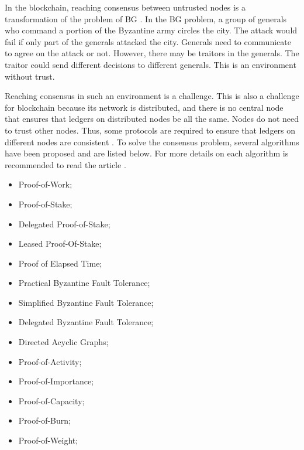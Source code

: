 In the blockchain, reaching consensus between untrusted nodes is a transformation of the problem of \ac{BG} \cite{lamport1982byzantine}. In the BG problem, a group of generals who command a portion of the Byzantine army circles the city. The attack would fail if only part of the generals attacked the city. Generals need to communicate to agree on the attack or not. However, there may be traitors in the generals. The traitor could send different decisions to different generals. This is an environment without trust.

Reaching consensus in such an environment is a challenge. This is also a challenge for blockchain because its network is distributed, and there is no central node that ensures that ledgers on distributed nodes be all the same. Nodes do not need to trust other nodes. Thus, some protocols are required to ensure that ledgers on different nodes are consistent \cite{kostarev2017review}. To solve the consensus problem, several algorithms have been proposed and are listed below. For more details on each algorithm is recommended to read the article \cite{mingxiao2017review}.

\begin{itemize}
\item Proof-of-Work;
\item Proof-of-Stake;
\item Delegated Proof-of-Stake;
\item Leased Proof-Of-Stake;
\item Proof of Elapsed Time;
\item Practical Byzantine Fault Tolerance;
\item Simplified Byzantine Fault Tolerance;
\item Delegated Byzantine Fault Tolerance;
\item Directed Acyclic Graphs;
\item Proof-of-Activity;
\item Proof-of-Importance;
\item Proof-of-Capacity;
\item Proof-of-Burn;
\item Proof-of-Weight;
\end{itemize}

